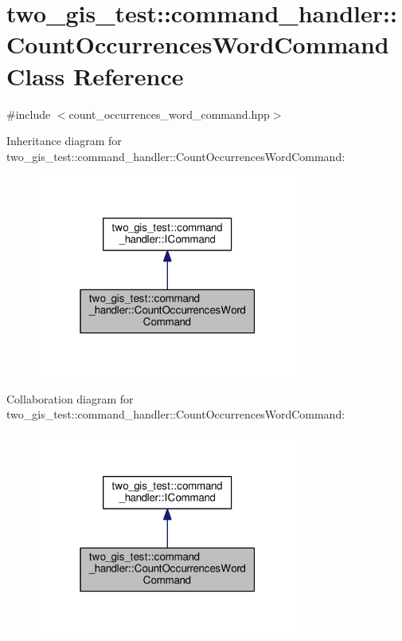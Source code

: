 \hypertarget{classtwo__gis__test_1_1command__handler_1_1_count_occurrences_word_command}{}\section{two\+\_\+gis\+\_\+test\+:\+:command\+\_\+handler\+:\+:Count\+Occurrences\+Word\+Command Class Reference}
\label{classtwo__gis__test_1_1command__handler_1_1_count_occurrences_word_command}


{\ttfamily \#include $<$count\+\_\+occurrences\+\_\+word\+\_\+command.\+hpp$>$}



Inheritance diagram for two\+\_\+gis\+\_\+test\+:\+:command\+\_\+handler\+:\+:Count\+Occurrences\+Word\+Command\+:\nopagebreak
\begin{figure}[H]
\begin{center}
\leavevmode
\includegraphics[width=244pt]{classtwo__gis__test_1_1command__handler_1_1_count_occurrences_word_command__inherit__graph}
\end{center}
\end{figure}


Collaboration diagram for two\+\_\+gis\+\_\+test\+:\+:command\+\_\+handler\+:\+:Count\+Occurrences\+Word\+Command\+:\nopagebreak
\begin{figure}[H]
\begin{center}
\leavevmode
\includegraphics[width=244pt]{classtwo__gis__test_1_1command__handler_1_1_count_occurrences_word_command__coll__graph}
\end{center}
\end{figure}
